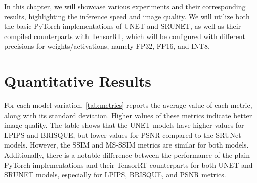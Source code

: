 \label{chap:Experiments}

% 
% 
% 


In this chapter, we will showcase various experiments and their corresponding results, highlighting the inference speed and image quality. We will utilize both the basic PyTorch implementations of UNET and SRUNET, as well as their compiled counterparts with TensorRT, which will be configured with different precisions for weights/activations, namely FP32, FP16, and INT8.

\section{Quantitative Results}
\label{sec:quantitative-results}

For each model variation, \cref{tab:metrics} reports the average value of each metric, along with its standard deviation. Higher values of these metrics indicate better image quality. The table shows that the UNET models have higher values for LPIPS and BRISQUE, but lower values for PSNR compared to the SRUNet models. However, the SSIM and MS-SSIM metrics are similar for both models. Additionally, there is a notable difference between the performance of the plain PyTorch implementations and their TensorRT counterparts for both UNET and SRUNET models, especially for LPIPS, BRISQUE, and PSNR metrics.

